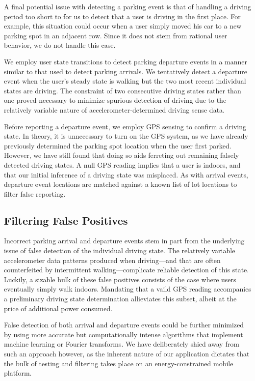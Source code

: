 A final potential issue with detecting a parking event is that of handling a
driving period too short to for us to detect that a user is driving in the first
place. For example, this situation could occur when a user simply moved his car
to a new parking spot in an adjacent row. Since it does not stem from rational
user behavior, we do not handle this case.

We employ user state transitions to detect parking departure events in a
manner similar to that used to detect parking arrivals. We tentatively detect a
departure event when the user's steady state is walking but the two most recent
individual states are driving. The constraint of two consecutive driving states
rather than one proved necessary to minimize spurious detection of driving due
to the relatively variable nature of accelerometer-determined driving sense
data.

Before reporting a departure event, we employ GPS sensing to confirm a driving
state. In theory, it is unnecessary to turn on the GPS system, as we have
already previously determined the parking spot location when the user first
parked. However, we have still found that doing so aids ferreting out remaining
falsely detected driving states. A null GPS reading implies that a user is
indoors, and that our initial inference of a driving state was misplaced. As
with arrival events, departure event locations are matched against a known list
of lot locations to filter false reporting.

\subsection{Filtering False Positives}
\label{subsec-false}

Incorrect parking arrival and departure events stem in part from the
underlying issue of false detection of the individual driving state. The
relatively variable accelerometer data patterns produced when driving---and
that are often counterfeited by intermittent walking---complicate reliable
detection of this state. Luckily, a sizable bulk of these false positives
consists of the case where users eventually simply walk indoors. Mandating
that a vaild GPS reading accompanies a preliminary driving state
determination allieviates this subset, albeit at the price of additional
power consumed.

False detection of both arrival and departure events could be further
minimized by using more accurate but computationally intense algorithms that
implement machine learning or Fourier transforms. We have deliberately shied
away from such an approach however, as the inherent nature of our application
dictates that the bulk of testing and filtering takes place on an
energy-constrained mobile platform.
